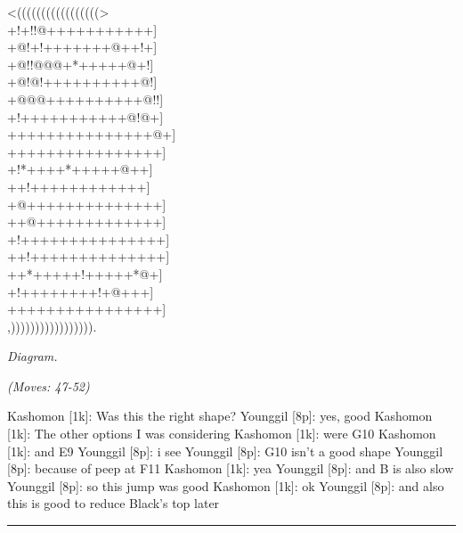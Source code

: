 \documentclass[letterpaper,12pt]{memoir}
\newcounter{GoFigure}[part]
\newcommand{\gofigure}{%
 \stepcounter{GoFigure}
 \centerline{\textit{Diagram.\thinspace\arabic{GoFigure}}}
}
\newcommand{\subtext}[1]{\centerline{\textit{#1}}}
\begin{document}
\begin{minipage}[t]{240pt}
{\gnos
<(((((((((((((((((>\\
+!+!!@+++++++++++]\\
+@!+!+++++++@++!+]\\
+@!!@@@+*+++++@+!]\\
+@!@!++++++++++@!]\\
+@@@++++++++++@!!]\\
+!+++++++++++@!@+]\\
+++++++++++++++@+]\\
++++++++++++++++]\\
+!*++++*+++++@++]\\
++!++++++++++++]\\
+@++++++++++++++]\\
++@+++++++++++++]\\
+!+++++++++++++++]\\
++!++++++++++++++]\\
++*+++++!+++++*@+]\\
+!++++++++!+@+++]\\
++++++++++++++++]\\
,))))))))))))))))).\\
}
\gofigure

\subtext{(Moves: 47-52)}
\end{minipage}
\begin{minipage}[t]{268.19999999999993pt}
\setlength{\parskip}{0.5em}
Kashomon [1k]: Was this the right shape?
Younggil [8p]: yes, good
Kashomon [1k]: The other options I was considering
Kashomon [1k]: were G10
Kashomon [1k]: and E9
Younggil [8p]: i see
Younggil [8p]: G10 isn't a good shape
Younggil [8p]: because of peep at F11
Kashomon [1k]: yea
Younggil [8p]: and B is also slow
Younggil [8p]: so this jump was good
Kashomon [1k]: ok
Younggil [8p]: and also this is good to reduce Black's top later


\end{minipage}
\vfill

\rule{\textwidth}{0.5pt}
\end{document}
